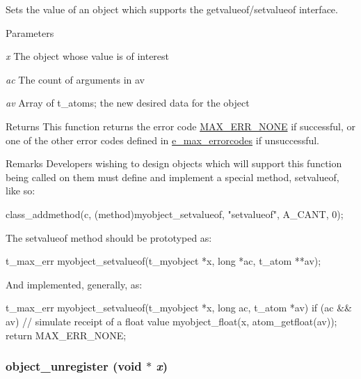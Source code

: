 Sets the value of an object which supports the {\ttfamily getvalueof/setvalueof} interface. 
\begin{DoxyParams}{Parameters}
\item[{\em x}]The object whose value is of interest \item[{\em ac}]The count of arguments in {\ttfamily av} \item[{\em av}]Array of t\_\-atoms; the new desired data for the object\end{DoxyParams}
\begin{DoxyReturn}{Returns}
This function returns the error code \hyperlink{group__misc_gga0764dd6c02b76cca7d053ae50555d69da6d22f77fef8b1e1b074cef5d29d935fd}{MAX\_\-ERR\_\-NONE} if successful, or one of the other error codes defined in \hyperlink{group__misc_ga0764dd6c02b76cca7d053ae50555d69d}{e\_\-max\_\-errorcodes} if unsuccessful.
\end{DoxyReturn}
\begin{DoxyRemark}{Remarks}
Developers wishing to design objects which will support this function being called on them must define and implement a special method, {\ttfamily setvalueof}, like so: 
\begin{DoxyCode}
    class_addmethod(c, (method)myobject_setvalueof, "setvalueof", A_CANT, 0);
\end{DoxyCode}


The {\ttfamily setvalueof} method should be prototyped as: 
\begin{DoxyCode}
    t_max_err myobject_setvalueof(t_myobject *x, long *ac, t_atom **av);
\end{DoxyCode}


And implemented, generally, as: 
\begin{DoxyCode}
    t_max_err myobject_setvalueof(t_myobject *x, long ac, t_atom *av)
    {
        if (ac && av) {
            // simulate receipt of a float value
            myobject_float(x, atom_getfloat(av));
        }
        return MAX_ERR_NONE;
    }
\end{DoxyCode}
 
\end{DoxyRemark}
\hypertarget{group__obj_ga2b5b3327e03edbefe753ebd6c8b7e152}{
\subsubsection[{object\_\-unregister}]{ object\_\-unregister (void $\ast$ {\em x})}}
\label{group__obj_ga2b5b3327e03edbefe753ebd6c8b7e152}


